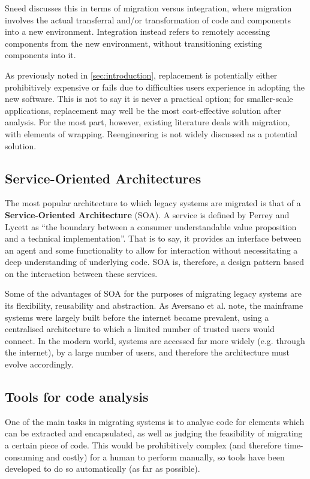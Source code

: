 \documentclass[12pt,journal,compsoc]{IEEEtran}
\begin{document}
Sneed\cite{Sneed2009} discusses this in terms of migration versus integration, where migration involves the actual transferral and/or transformation of code and components into a new environment. Integration instead refers to remotely accessing components from the new environment, without transitioning existing components into it.

As previously noted in \ref{sec:introduction}, replacement is potentially either prohibitively expensive\cite{Duncan1996} or fails due to difficulties users experience in adopting the new software\cite{Sneed2011}. This is not to say it is never a practical option; for smaller-scale applications, replacement may well be the most cost-effective solution after analysis. For the most part, however, existing literature deals with migration\cite{Aversano2001,Bodhuin2002,Canfora2006,Canfora2000,Canfora2008,Lucia1997,Lewis2006,Sneed2011,Sneed2008,Sneed2009,Sneed2013,Wu2005,Sneed1996,Duncan1996}, with elements of wrapping\cite{Chiang2001,Canfora2008,Sneed1996}. Reengineering is not widely discussed as a potential solution.

\subsection{Service-Oriented Architectures}
\label{subsec:soa}
The most popular architecture to which legacy systems are migrated is that of a \textbf{Service-Oriented Architecture} (SOA)\cite{Sneed2008,Almonaies2010,Koschel2009,Canfora2006,Sneed2009,Canfora2008}. A service is defined by Perrey and Lycett\cite{Perrey2003} as ``the boundary between a consumer understandable value proposition and a technical implementation''. That is to say, it provides an interface between an agent and some functionality to allow for interaction without necessitating a deep understanding of underlying code. SOA is, therefore, a design pattern based on the interaction between these services.

Some of the advantages of SOA for the purposes of migrating legacy systems are its flexibility, reusability and abstraction\cite{Almonaies2010}. As Aversano et al. note\cite{Aversano2001}, the mainframe systems were largely built before the internet became prevalent, using a centralised architecture to which a limited number of trusted users would connect. In the modern world, systems are accessed far more widely (e.g. through the internet), by a large number of users, and therefore the architecture must evolve accordingly.

\subsection{Tools for code analysis}
\label{subsec:toolsanalysis}
One of the main tasks in migrating systems is to analyse code for elements which can be extracted and encapsulated, as well as judging the feasibility of migrating a certain piece of code. This would be prohibitively complex (and therefore time-consuming and costly) for a human to perform manually, so tools have been developed to do so automatically (as far as possible).
\end{document}
